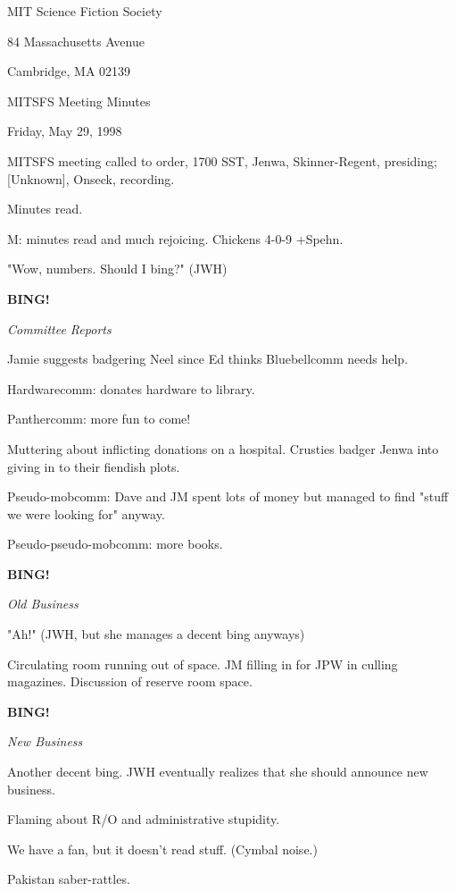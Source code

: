 \documentclass[12pt]{article}
\newcommand{\bing}{{\bf BING!} }
\newcommand{\goto}[1]{\bing \vskip 12pt \centerline{{\em{#1}}}}
\begin{document}
\begin{center}

MIT Science Fiction Society 

84 Massachusetts Avenue

Cambridge, MA 02139

\vspace{12pt}

MITSFS Meeting Minutes 

Friday, May 29, 1998

\end{center}
 
\vspace{18pt}

\setlength{\parskip}{6pt}

\noindent
MITSFS meeting called to order, 1700 SST,
Jenwa, Skinner-Regent, presiding; [Unknown], Onseck, recording.

Minutes read.

M: minutes read and much rejoicing. Chickens 4-0-9 +Spehn.

"Wow, numbers. Should I bing?" (JWH)

\goto{Committee Reports}

Jamie suggests badgering Neel since Ed thinks Bluebellcomm needs help.

Hardwarecomm: donates hardware to library.

Panthercomm: more fun to come!

Muttering about inflicting donations on a hospital. Crusties badger Jenwa into giving in to their fiendish plots.

Pseudo-mobcomm: Dave and JM spent lots of money but managed to find "stuff we were looking for" anyway.

Pseudo-pseudo-mobcomm: more books.

\goto{Old Business}

"Ah!" (JWH, but she manages a decent bing anyways)

Circulating room running out of space. JM filling in for JPW in culling magazines. Discussion of reserve room space.

\goto{New Business}

Another decent bing. JWH eventually realizes that she should announce new business.

Flaming about R/O and administrative stupidity.

We have a fan, but it doesn't read stuff. (Cymbal noise.)

Pakistan saber-rattles.
\end{document}
